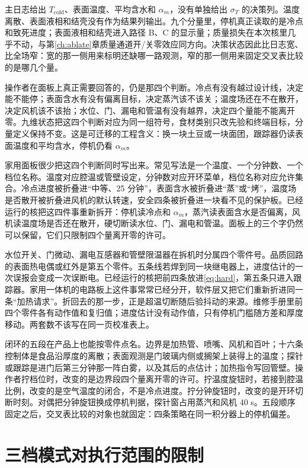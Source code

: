 主日志给出 \(T_{\mathrm{cold}}\)、表面温度、平均含水和 \(\alpha_m\)，没有单独给出 \(\sigma_T\) 的决策列。温度离散、表面液相和结壳没有作为结果列输出。九个分量里，停机真正读取的是冷点和致死进度；表面液相和结壳进入路径 B、C 的显示量；质量损失在本次核里几乎不动，与第\ref{ch:ablate}章质量通道开/关零效应同方向。决策状态因此比日志宽、比全场窄：宽的那一侧用来标明还缺哪一路观测，窄的那一侧用来固定交叉表比较的是哪几个量。

操作者在面板上真正需要回答的，仍是那四个判断。冷点有没有越过设计线，决定能不能停；表面含水有没有偏离目标，决定蒸汽该不该关；温度场还在不在散开，决定风机该不该抬；水位、门、漏电和管温有没有越界，决定四个量能不能离开零。九维状态把这四个判断对应为同一组符号，食材类别只改先验和终端目标，分量定义保持不变。这是可迁移的工程含义：换一块土豆或一块面团，跟踪器仍读表面温度和平均含水，停机仍看 \(\alpha_m\)。

家用面板很少把这四个判断同时写出来。常见写法是一个温度、一个分钟数、一个档位名称。温度对应腔温或管壁设定，分钟数对应开环菜单，档位名称对应允许集合。冷点进度被折叠进“中等、25 分钟”，表面含水被折叠进“蒸”或“烤”，温度场是否散开被折叠进风机的默认转速，安全四条被折叠进一块看不见的保护板。已经运行的核把这四件事重新拆开：停机读冷点和 \(\alpha_m\)，蒸汽读表面含水是否偏离，风机读温度场是否还在散开，硬切断读水位、门、漏电和管温。面板上的三个字仍然可以保留，它们只限制四个量离开零的许可。

水位开关、门微动、漏电互感器和管壁限温器在拆机时分属四个零件号。品质回路的表面热电偶或红外是第五个零件。五条线若焊到同一块继电器上，进度估计的一次误报会变成一次误断电。已经运行的核把前四条放进\eqref{eq:hard}，第五条只进入跟踪器。家用一体机的电路板上这件事常常已经分开，软件层又把它们重新折进同一条“加热请求”。折回去的那一步，正是超温切断随后验抖动的来源。维修手册里前四个零件各有动作值和复归值；进度估计没有动作值，只有停机门槛随方差和厚度移动。两套数不该写在同一页校准表上。

闭环的五段在产品上也能按零件点名。边界是加热管、喷嘴、风机和百叶；十六条控制体是食品沿厚度的离散；表面观测是门玻璃内侧或搁架上装得上的温度；探针或跟踪是进门后第三分钟那一阵白雾，以及其后的点估计；加热指令写回管壁。操作者拧档位时，改变的是边界段四个量离开零的许可。拧温度旋钮时，若接到腔温比例，改变的是空气温度的闭合，不是冷点进度。拧分钟旋钮时，改变的是开环切断时刻。对偶把分钟旋钮换成停机判据，探针窗占用蒸汽和风机 40 s。五段顺序固定之后，交叉表比较的对象也就固定：四条策略在同一积分器上的停机偏差。

\section{三档模式对执行范围的限制}

